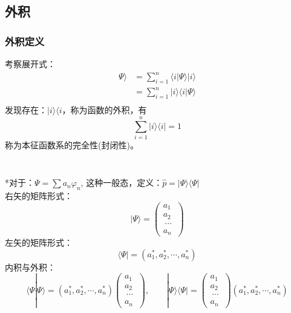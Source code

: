\subsection{外积}

\begin{frame}
    \frametitle{外积定义}
    考察展开式：
    $$\begin{aligned}
    \Psi \rangle &= \sum\limits_{i=1} ^n \langle i | \Psi \rangle |i\rangle\\
                 &= \sum\limits_{i=1} ^n |i\rangle\langle i | \Psi \rangle \\
    \end{aligned}
    $$
    发现存在：$|i\rangle\langle i$，称为函数的外积，有
    \[\sum\limits_{i=1} ^n |i\rangle\langle i |=1\]
    称为本征函数系的完全性(封闭性)。 
\end{frame} 

\begin{frame}
    \frametitle{}
    ~~\\
    *对于：$ \Psi =\sum a_n \varphi_n $, 这种一般态，定义：$\hat{p} = |\Psi\rangle\langle \Psi |$\\
    右矢的矩阵形式：
    $$|\Psi\rangle = \begin{pmatrix}
        a_1\\
        a_2\\\
        \cdots\\
        a_n\
    \end{pmatrix}$$ 
    左矢的矩阵形式：
    $$ \langle\Psi| = (a_1 ^*, a_2 ^*, \cdots, a_n ^*) $$
    内积与外积：
    $$\langle\Psi|\Psi\rangle= (a_1 ^*, a_2 ^*, \cdots, a_n ^*) \begin{pmatrix}
        a_1\\
        a_2\\\
        \cdots\\
        a_n\
    \end{pmatrix},\qquad  |\Psi\rangle\langle\Psi|= \begin{pmatrix}
        a_1\\
        a_2\\\
        \cdots\\
        a_n\
    \end{pmatrix} (a_1 ^*, a_2 ^*, \cdots, a_n ^*) $$
\end{frame} 

